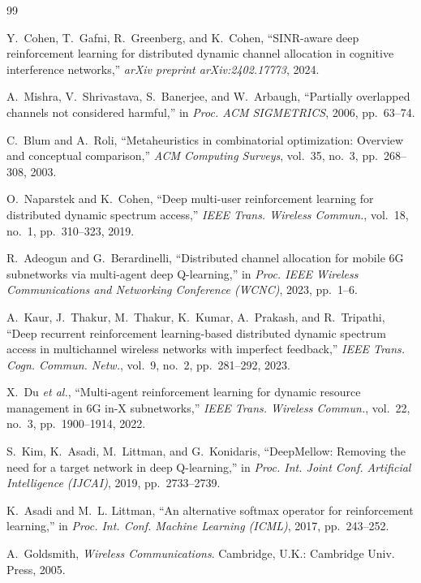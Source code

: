 \documentclass[journal]{IEEEtran}
\begin{document}
\begin{thebibliography}{99}

Y.~Cohen, T.~Gafni, R.~Greenberg, and K.~Cohen,
``SINR-aware deep reinforcement learning for distributed dynamic channel
allocation in cognitive interference networks,''
\emph{arXiv preprint arXiv:2402.17773}, 2024.

A.~Mishra, V.~Shrivastava, S.~Banerjee, and W.~Arbaugh,
``Partially overlapped channels not considered harmful,''
in \emph{Proc. ACM SIGMETRICS}, 2006, pp.~63--74.

C.~Blum and A.~Roli,
``Metaheuristics in combinatorial optimization: Overview and conceptual
comparison,'' \emph{ACM Computing Surveys}, vol.~35, no.~3, pp.~268--308, 2003.

O.~Naparstek and K.~Cohen,
``Deep multi-user reinforcement learning for distributed dynamic spectrum
access,'' \emph{IEEE Trans. Wireless Commun.}, vol.~18, no.~1, pp.~310--323,
2019.

R.~Adeogun and G.~Berardinelli,
``Distributed channel allocation for mobile 6G subnetworks via multi-agent deep
Q-learning,'' in \emph{Proc. IEEE Wireless Communications and Networking
Conference (WCNC)}, 2023, pp.~1--6.

A.~Kaur, J.~Thakur, M.~Thakur, K.~Kumar, A.~Prakash, and R.~Tripathi,
``Deep recurrent reinforcement learning-based distributed dynamic spectrum
access in multichannel wireless networks with imperfect feedback,''
\emph{IEEE Trans. Cogn. Commun. Netw.}, vol.~9, no.~2, pp.~281--292, 2023.

X.~Du \emph{et al.},
``Multi-agent reinforcement learning for dynamic resource management in 6G in-X
subnetworks,'' \emph{IEEE Trans. Wireless Commun.}, vol.~22, no.~3,
pp.~1900--1914, 2022.

S.~Kim, K.~Asadi, M.~Littman, and G.~Konidaris,
``DeepMellow: Removing the need for a target network in deep Q-learning,''
in \emph{Proc. Int. Joint Conf. Artificial Intelligence (IJCAI)}, 2019,
pp.~2733--2739.

K.~Asadi and M.~L. Littman,
``An alternative softmax operator for reinforcement learning,''
in \emph{Proc. Int. Conf. Machine Learning (ICML)}, 2017, pp.~243--252.

A.~Goldsmith,
\emph{Wireless Communications}.
Cambridge, U.K.: Cambridge Univ. Press, 2005.


\end{thebibliography}
\end{document}
